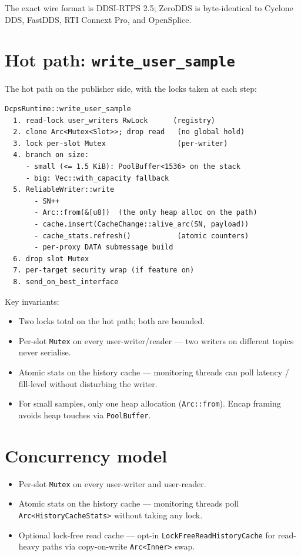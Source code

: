 \documentclass[11pt,a4paper]{article}
\begin{document}
The exact wire format is DDSI-RTPS 2.5; ZeroDDS is byte-identical
to Cyclone DDS, FastDDS, RTI Connext Pro, and OpenSplice.

\section{Hot path: \texttt{write\_user\_sample}}

The hot path on the publisher side, with the locks taken at each
step:

\begin{lstlisting}
DcpsRuntime::write_user_sample
  1. read-lock user_writers RwLock      (registry)
  2. clone Arc<Mutex<Slot>>; drop read   (no global hold)
  3. lock per-slot Mutex                 (per-writer)
  4. branch on size:
     - small (<= 1.5 KiB): PoolBuffer<1536> on the stack
     - big: Vec::with_capacity fallback
  5. ReliableWriter::write
       - SN++
       - Arc::from(&[u8])  (the only heap alloc on the path)
       - cache.insert(CacheChange::alive_arc(SN, payload))
       - cache_stats.refresh()           (atomic counters)
       - per-proxy DATA submessage build
  6. drop slot Mutex
  7. per-target security wrap (if feature on)
  8. send_on_best_interface
\end{lstlisting}

Key invariants:

\begin{itemize}[leftmargin=*]
  \item Two locks total on the hot path; both are bounded.
  \item Per-slot \texttt{Mutex} on every user-writer/reader — two
        writers on different topics never serialise.
  \item Atomic stats on the history cache — monitoring threads can
        poll latency / fill-level without disturbing the writer.
  \item For small samples, only one heap allocation
        (\texttt{Arc::from}). Encap framing avoids heap touches
        via \texttt{PoolBuffer}.
\end{itemize}

\section{Concurrency model}

\begin{itemize}[leftmargin=*]
  \item Per-slot \texttt{Mutex} on every user-writer and
        user-reader.
  \item Atomic stats on the history cache —
        monitoring threads poll \texttt{Arc<HistoryCacheStats>}
        without taking any lock.
  \item Optional lock-free read cache — opt-in
        \texttt{LockFreeReadHistoryCache} for read-heavy paths via
        copy-on-write \texttt{Arc<Inner>} swap.
\end{itemize}
\end{document}
